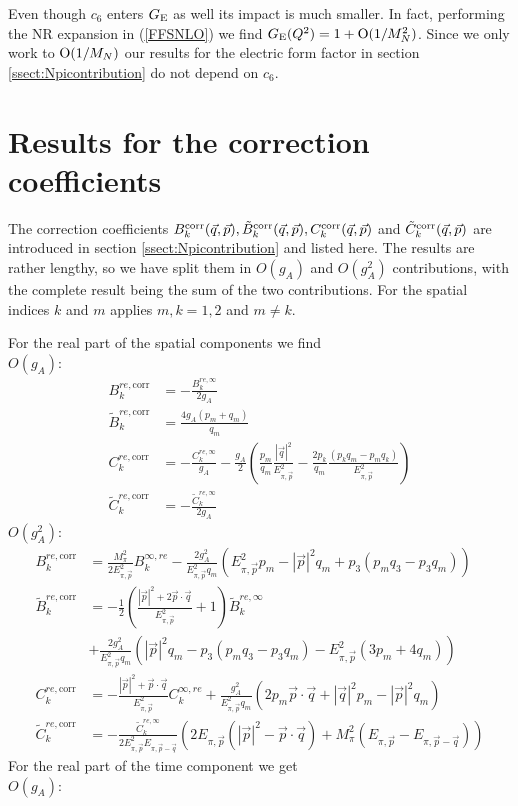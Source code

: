 \documentclass[11pt,prd,aps,showpacs,eqsecnum,floatfix,nofootinbib,preprint,tightenlines]{revtex4}
\newcommand{\pref}[1]{(\ref{#1})}
\newcommand{\Epipmq}{E_{\pi, \vec{p}-\vec{q}}}
\newcommand{\Epip}{E_{\pi, \vec{p}}}
\newcommand{\GE}{G_{\rm E}}
\newcommand{\psq}{|\vec{p}|^2}
\newcommand{\qsq}{|\vec{q}|^2}
\newcommand{\pq}{\vec{p} \cdot \vec{q}}
\begin{document}
\begin{appendix}
Even though $c_6$ enters $\GE$ as well its impact is much smaller. In fact, performing the NR expansion in \pref{FFSNLO} we find $\GE(Q^2)= 1+{\rm O}(1/M_N^2)$. Since we only work to ${\rm O}(1/M_N)$ our results for the electric form factor in section \ref{ssect:Npicontribution} do not depend on $c_6$.

\section{Results for the correction coefficients}\label{app:corrcoeff}
The correction coefficients $B_{k}^{\rm corr}(\vec{q},\vec{p}),\tilde{B}_{k}^{\rm corr}(\vec{q},\vec{p}),C_{k}^{\rm corr}(\vec{q},\vec{p})$ and $\tilde C_{k}^{\rm corr}(\vec{q},\vec{p})$ are introduced in section \ref{ssect:Npicontribution} and listed here. 
The results are rather lengthy, so we have split them in $O(g_A)$ and $O(g_A^2)$ contributions, with the complete result being the sum of the two contributions. For the spatial indices $k$ and $m$ applies $ m, k = 1, 2$ and $ m \neq k$.

For the real part of the spatial components we find\\[0.3cm]
$O(g_A)$:
\begin{align}
	B^{re,\text{corr}}_k &= -\frac{ B^{re,\infty}_k}{2g_A}
	\\
	\tilde{B}^{re,\text{corr}}_k &= \frac{4 g_A (p_m+q_m)}{q_m}
	\\
	C^{re,\text{corr}}_k &= -\frac{ C^{re,\infty}_k}{g_A} - \frac{g_A}{2}
						\left( \frac{p_m}{q_m} \frac{\qsq}{\Epip^2} - \frac{2 p_k}{q_m} \frac{( p_k q_m - p_m q_k )}{\Epip^2} \right)
	\\
	\tilde{C}^{re,\text{corr}}_k &= -\frac{ \tilde{C}^{re,\infty}_k}{2g_A}						
\end{align}
$O(g_A^2)$:
\begin{align}
	B^{re,\text{corr}}_k &= \frac{M_\pi^2}{2\Epip^2} B^{\infty, re}_k  -
		\frac{2 g_A^2}{\Epip^2 q_m} \left( \Epip^2 p_m - \psq q_m + p_3 ( p_m q_3 - p_3 q_m) \right)
	\\
	\tilde{B}^{re,\text{corr}}_k &= -\frac{1}{2} \left( \frac{\psq + 2 \pq}{\Epip^2} + 1 \right)
		\tilde{B}^{re,\infty}_k 
		\\ \nonumber
		&+ \frac{2 g_A^2}{\Epip^2 q_m} \left(\psq q_m - p_3 (p_m q_3 - p_3 q_m) - \Epip^2 (3 p_m + 4 q_m)\right)
	\\
	C^{re,\text{corr}}_k &= -\frac{\psq + \pq}{\Epip^2} C^{\infty, re}_k  +
		\frac{g_A^2}{\Epip^2 q_m} \left( 2 p_m \pq + \qsq p_m - \psq q_m \right)
	\\
	\tilde{C}^{re,\text{corr}}_k &= -\frac{\tilde{C}^{re,\infty}_k}{2 \Epip^2 \Epipmq} 
		\left(2 \Epip ( \psq - \pq ) + M^2_\pi ( \Epip - \Epipmq ) \right)
\end{align}
For the {real} part of the {time} component we get\\[0.3cm]
$O(g_A)$:


\end{appendix}
\end{document}
